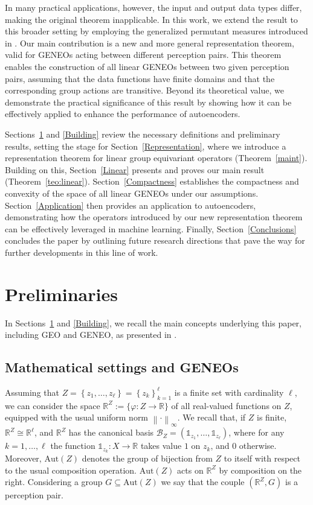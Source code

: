 \documentclass[11pt]{article}
\newcommand{\R}{\mathbb{R}}
\newcommand{\Aut}{\mathrm{Aut}}
\begin{document}
In many practical applications, however, the input and output data types differ, making the original theorem inapplicable. In this work, we extend the result to this broader setting by employing the generalized permutant measures introduced in \cite{FaFeFr2023}. Our main contribution is a new and more general representation theorem, valid for GENEOs acting between different perception pairs. 
This theorem enables the construction of all linear GENEOs between two given perception pairs, assuming that the data functions have finite domains and that the corresponding group actions are transitive.
Beyond its theoretical value, we demonstrate the practical significance of this result by showing how it can be effectively applied to enhance the performance of autoencoders.

Sections~\ref{Preliminaries} and \ref{Building} review the necessary definitions and preliminary results, setting the stage for Section~\ref{Representation}, where we introduce a representation theorem for linear group equivariant operators (Theorem~\ref{maint}). Building on this, Section~\ref{Linear} presents and proves our main result (Theorem~\ref{teo:linear}). Section~\ref{Compactness} establishes the compactness and convexity of the space of all linear GENEOs under our assumptions. Section~\ref{Application} then provides an application to autoencoders, demonstrating how the operators introduced by our new representation theorem can be effectively leveraged in machine learning. Finally, Section~\ref{Conclusions} concludes the paper by outlining future research directions that pave the way for further developments in this line of work.

\section{Preliminaries}
\label{Preliminaries}

In Sections~\ref{Preliminaries} and \ref{Building}, we recall the main concepts underlying this paper, including GEO and GENEO, as presented in \cite{FaFeFr2023}.

\subsection{Mathematical settings and GENEOs}\label{msG}
Assuming that $Z=\left\{ z_1, \dots, z_\ell \right\} = \left\{ z_k \right\}_{k=1}^\ell$ is a finite set with cardinality $\ell$, we can consider the space $\R^Z:= \{\varphi \colon Z \to \R \}$ of all real-valued functions on $Z$, equipped with the usual uniform norm $\left\| \cdot \right\|_\infty$. We recall that, if $Z$ is finite, $\R^Z \cong \R^\ell$, and $\R^Z$ has the canonical basis $\mathcal{B}_{Z}=\left( \mathds{1}_{z_1}, \dots, \mathds{1}_{z_\ell} \right)$, where for any $k = 1, \dots, \ell$ the function $\mathds{1}_{z_k} \colon X \to \R$ takes value $1$ on $z_k$, and $0$ otherwise. Moreover, $\Aut(Z)$ denotes the group of bijection from $Z$ to itself with respect to the usual composition operation. $\Aut(Z)$  acts on $\R^Z$ by composition on the right. Considering a group $G \subseteq \Aut(Z)$ we say that the couple $\left( \R^Z, G \right)$ is a perception pair.
\end{document}
